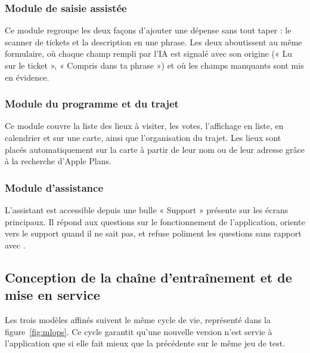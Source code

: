 \subsubsection{Module de saisie assistée}

Ce module regroupe les deux façons d'ajouter une dépense sans tout taper : le scanner de
tickets et la description en une phrase. Les deux aboutissent au même formulaire, où chaque
champ rempli par l'IA est signalé avec son origine (« Lu sur le ticket », « Compris dans ta
phrase ») et où les champs manquants sont mis en évidence.

\subsubsection{Module du programme et du trajet}

Ce module couvre la liste des lieux à visiter, les votes, l'affichage en liste, en
calendrier et sur une carte, ainsi que l'organisation du trajet. Les lieux sont placés
automatiquement sur la carte à partir de leur nom ou de leur adresse grâce à la recherche
d'Apple Plans.

\subsubsection{Module d'assistance}

L'assistant est accessible depuis une bulle « Support » présente sur les écrans principaux.
Il répond aux questions sur le fonctionnement de l'application, oriente vers le support
quand il ne sait pas, et refuse poliment les questions sans rapport avec \equipay.

\subsection{Conception de la chaîne d'entraînement et de mise en service}

Les trois modèles affinés suivent le même cycle de vie, représenté dans la
figure~\ref{fig:mlops}. Ce cycle garantit qu'une nouvelle version n'est servie à
l'application que si elle fait mieux que la précédente sur le même jeu de test.

